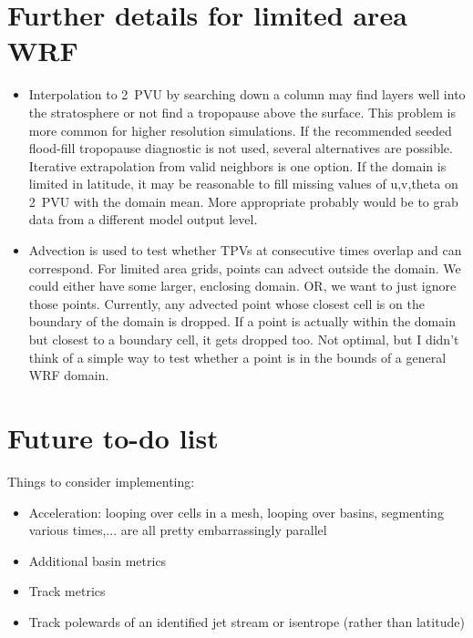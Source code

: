 \documentclass[a4paper]{article}
\begin{document}
\section{Further details for limited area WRF}
\begin{itemize}
\item Interpolation to 2~PVU by searching down a column may find layers well into the stratosphere or not find a tropopause above the surface. This problem is more common for higher resolution simulations. If the recommended seeded flood-fill tropopause diagnostic is not used, several alternatives are possible. Iterative extrapolation from valid neighbors is one option. If the domain is limited in latitude, it may be reasonable to fill missing values of u,v,theta on 2~PVU with the domain mean. More appropriate probably would be to grab data from a different model output level.
\item Advection is used to test whether TPVs at consecutive times overlap and can correspond. For limited area grids, points can advect outside the domain. We could either have some larger, enclosing domain. OR, we want to just ignore those points. Currently, any advected point whose closest cell is on the boundary of the domain is dropped. If a point is actually within the domain but closest to a boundary cell, it gets dropped too. Not optimal, but I didn't think of a simple way to test whether a point is in the bounds of a general WRF domain.
\end{itemize}

\section{Future to-do list}
Things to consider implementing:
\begin{itemize}
\item Acceleration: looping over cells in a mesh, looping over basins, segmenting various times,... are all pretty embarrassingly parallel
\item Additional basin metrics
\item Track metrics
\item Track polewards of an identified jet stream or isentrope (rather than latitude)
\end{itemize}
\end{document}
